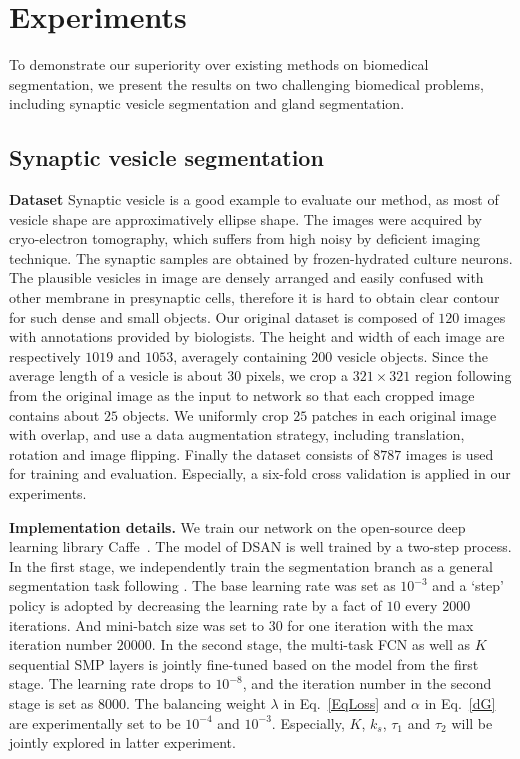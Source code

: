 \section{Experiments}
\label{sec:results}
To demonstrate our superiority over existing methods on biomedical segmentation, we present the results on two challenging biomedical problems, including synaptic vesicle segmentation and gland segmentation.

\subsection{Synaptic vesicle segmentation}
\noindent\textbf{Dataset}
Synaptic vesicle is a good example to evaluate our method, as most of vesicle shape are approximatively ellipse shape.
The images were acquired by cryo-electron tomography, which suffers from high noisy by deficient imaging technique.
The synaptic samples are obtained by frozen-hydrated culture neurons.
The plausible vesicles in image are densely arranged and easily confused with other membrane in presynaptic cells, therefore it is hard to obtain clear contour for such dense and small objects.
Our original dataset is composed of $120$ images with annotations provided by biologists.
The height and width of each image are respectively $1019$ and $1053$, averagely containing $200$ vesicle objects.
Since the average length of a vesicle is about $30$ pixels, we crop a $321\times 321$ region following \cite{Chen2014a} from the original image as the input to network so that each cropped image contains about $25$ objects.
We uniformly crop $25$ patches in each original image with overlap, and use a data augmentation strategy, including translation, rotation and image flipping.
Finally the dataset consists of $8787$ images is used for training and evaluation.
Especially, a six-fold cross validation is applied in our experiments.

\noindent\textbf{Implementation details.}
We train our network on the open-source deep learning library Caffe~\cite{Jia2014}.
The model of DSAN is well trained by a two-step process.
In the first stage, we independently train the segmentation branch as a general segmentation task following \cite{Chen2014a}.
The base learning rate was set as $10^{-3}$ and a `step' policy is adopted by decreasing the learning rate by a fact of $10$ every $2000$ iterations.
And mini-batch size was set to $30$ for one iteration with the max iteration number $20000$.
In the second stage, the multi-task FCN as well as $K$ sequential SMP layers is jointly fine-tuned based on the model from the first stage.
The learning rate drops to $10^{-8}$, and the iteration number in the second stage is set as $8000$.
The balancing weight $\lambda$ in Eq.~\ref{EqLoss} and $\alpha$ in Eq.~\ref{dG} are experimentally set to be $10^{-4}$ and $10^{-3}$.
Especially, $K$, $k_s$, $\tau_1$ and $\tau_2$ will be jointly explored in latter experiment.

